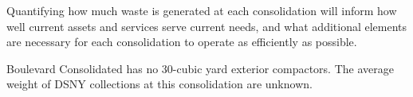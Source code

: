 
    Quantifying how much waste is generated at each consolidation will inform how well current assets and services serve current needs, and what additional elements are necessary for each consolidation to operate as efficiently as possible.
    
    Boulevard Consolidated has no 30-cubic yard exterior compactors. The average weight of DSNY collections at this consolidation are unknown.